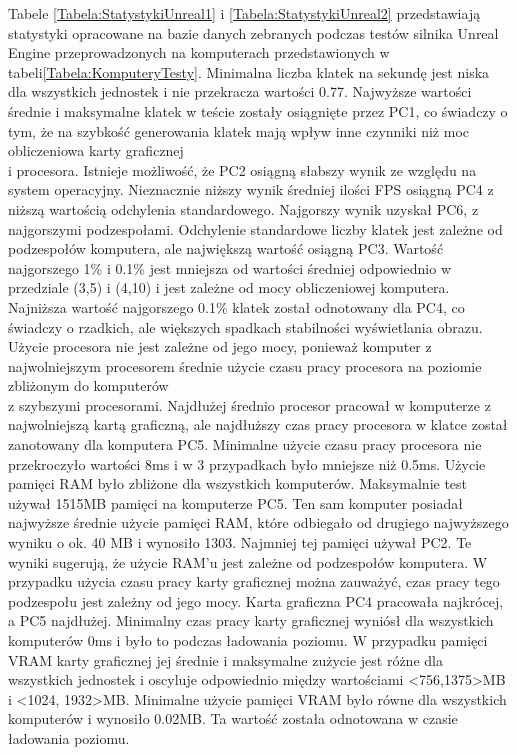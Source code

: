 \documentclass[12pt,twoside]{article}
\begin{document}
Tabele \ref{Tabela:StatystykiUnreal1} i \ref{Tabela:StatystykiUnreal2}
przedstawiają statystyki opracowane na bazie danych zebranych podczas testów
silnika Unreal Engine przeprowadzonych na komputerach przedstawionych w
tabeli\ref{Tabela:KomputeryTesty}. Minimalna liczba klatek na sekundę jest niska
dla wszystkich jednostek i nie przekracza wartości 0.77. Najwyższe wartości
średnie i maksymalne klatek w teście zostały osiągnięte przez PC1, co świadczy o
tym, że na szybkość generowania klatek mają wpływ inne czynniki niż moc
obliczeniowa karty graficznej\\i procesora. Istnieje możliwość, że PC2 osiągną
słabszy wynik ze względu na system operacyjny. Nieznacznie niższy wynik średniej
ilości FPS osiągną PC4 z niższą wartością odchylenia standardowego. Najgorszy
wynik uzyskał PC6, z najgorszymi podzespołami. Odchylenie standardowe liczby
klatek jest zależne od podzespołów komputera, ale największą wartość osiągną
PC3. Wartość najgorszego 1\% i 0.1\% jest mniejsza od wartości średniej
odpowiednio w przedziale (3,5) i (4,10) i jest zależne od mocy obliczeniowej
komputera. Najniższa wartość najgorszego 0.1\% klatek został odnotowany dla PC4,
co świadczy o rzadkich, ale większych spadkach stabilności wyświetlania obrazu.
Użycie procesora nie jest zależne od jego mocy, ponieważ komputer z
najwolniejszym procesorem średnie użycie czasu pracy procesora na poziomie
zbliżonym do komputerów\\z szybszymi procesorami. Najdłużej średnio procesor
pracował w komputerze z najwolniejszą kartą graficzną, ale najdłuższy czas pracy
procesora w klatce został zanotowany dla komputera PC5. Minimalne użycie czasu
pracy procesora nie przekroczyło wartości 8ms i w 3 przypadkach było mniejsze
niż 0.5ms. Użycie pamięci RAM było zbliżone dla wszystkich komputerów.
Maksymalnie test używał 1515MB pamięci na komputerze PC5. Ten sam komputer
posiadał najwyższe średnie użycie pamięci RAM, które odbiegało od drugiego
najwyższego wyniku o ok. 40 MB i wynosiło 1303. Najmniej tej pamięci używał PC2.
Te wyniki sugerują, że użycie RAM’u jest zależne od podzespołów komputera. W
przypadku użycia czasu pracy karty graficznej można zauważyć, czas pracy tego
podzespołu jest zależny od jego mocy. Karta graficzna PC4 pracowała najkrócej, a
PC5 najdłużej. Minimalny czas pracy karty graficznej wyniósł dla wszystkich
komputerów 0ms i było to podczas ładowania poziomu. W przypadku pamięci VRAM
karty graficznej jej średnie i maksymalne zużycie jest różne dla wszystkich
jednostek i oscyluje odpowiednio między wartościami <756,1375>MB i <1024,
1932>MB. Minimalne użycie pamięci VRAM było równe dla wszystkich komputerów i
wynosiło 0.02MB. Ta wartość została odnotowana w czasie ładowania poziomu. 
\end{document}
